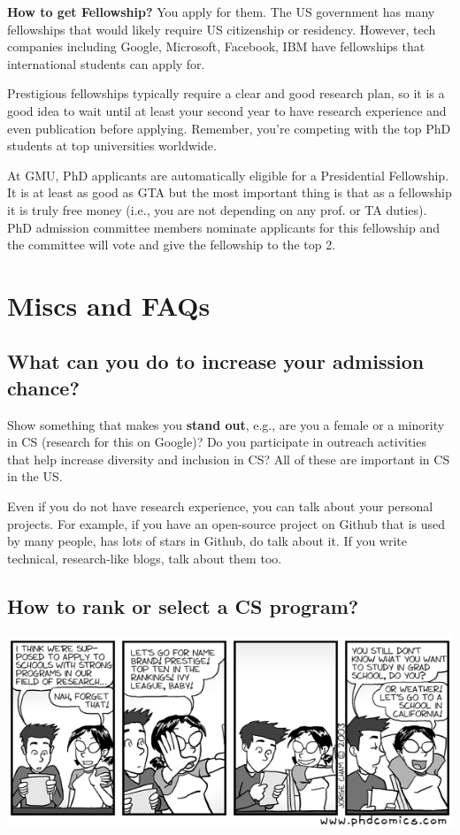 \documentclass[11pt]{article}
\newenvironment{commentbox}{
 \small
    \begin{cbox}
 }{
   \end{cbox}
}
\begin{document}
\textbf{How to get Fellowship?} You apply for them.  The US government has many fellowships that would likely require US citizenship or residency.  However, tech companies including Google, Microsoft, Facebook, IBM have fellowships that international students can apply for. 

Prestigious fellowships typically require a clear and good research plan, so it is a good idea to wait until at least your second year to have research experience and even publication before applying. Remember, you're competing with the top PhD students at top universities worldwide. 


\begin{commentbox}
At GMU, PhD applicants are automatically eligible for a Presidential Fellowship.  It is at least as good as GTA but the most important thing is that as a fellowship it is truly free money (i.e., you are not depending on any prof. or TA duties).  PhD admission committee members nominate applicants for this fellowship and the committee will vote and give the fellowship to the top 2.
\end{commentbox}


\section{Miscs and FAQs}

\subsection{What can you do to increase your admission chance?}

 Show something that makes you \textbf{stand out}, e.g., are you a female or a minority in CS (research for this on Google)? Do you participate in outreach activities that help increase diversity and inclusion in CS?  All of these are important in CS in the US.
    
Even if you do not have research experience, you can talk about your personal projects. For example, if you have an open-source project on Github that is used by many people, has lots of stars in Github, do talk about it. If you write technical, research-like blogs, talk about them too.

\subsection{How to rank or select a CS program?}
   \begin{center}
    \includegraphics[scale=0.4]{c1.png}
   \end{center}
\end{document}
